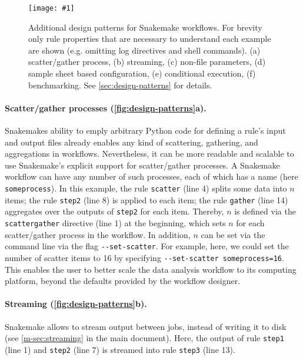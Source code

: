 \documentclass{scrartcl}
\newcommand{\image}[1]{\centering\texttt{[image: \#1]}}
\begin{document}
\begin{figure}
	\image{design-patterns.pdf}
	\caption{Additional design patterns for Snakemake workflows.
		For brevity only rule properties that are necessary to understand each example are shown (e.g. omitting log directives and shell commands).
		(a) scatter/gather process, (b) streaming, (c) non-file parameters, (d) sample sheet based configuration, (e) conditional execution, (f) benchmarking.
		See \autoref{sec:design-patterns} for details.
	}\label{fig:design-patterns}
\end{figure}

\paragraph{Scatter/gather processes (\autoref{fig:design-patterns}a).}
Snakemakes ability to emply arbitrary Python code for defining a rule's input and output files already enables any kind of scattering, gathering, and aggregations in workflows.
Nevertheless, it can be more readable and scalable to use Snakemake's explicit support for scatter/gather processes.
A Snakemake workflow can have any number of such processes, each of which has a name (here \lstinline!someprocess!).
In this example, the rule \lstinline!scatter! (line 4) splits some data into $n$ items; the rule \lstinline!step2! (line 8) is applied to each item; the rule \lstinline!gather! (line 14) aggregates over the outputs of \lstinline!step2! for each item.
Thereby, $n$ is defined via the \lstinline!scattergather! directive (line 1) at the beginning, which sets $n$ for each scatter/gather process in the workflow.
In addition, $n$ can be set via the command line via the flag \lstinline!--set-scatter!.
For example, here, we could set the number of scatter items to 16 by specifying \lstinline!--set-scatter someprocess=16!.
This enables the user to better scale the data analysis workflow to its computing platform, beyond the defaults provided by the workflow designer.

\paragraph{Streaming (\autoref{fig:design-patterns}b).}
Snakemake allows to stream output between jobs, instead of writing it to disk (see \autoref{m-sec:streaming} in the main document).
Here, the output of rule \lstinline!step1! (line 1) and \lstinline!step2! (line 7) is streamed into rule \lstinline!step3! (line 13).
\end{document}
